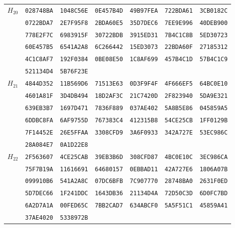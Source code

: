 \begin{table}
\begin{tabular}{@{}ccccccc@{}}
\midrule
\multirow{6}{*}{$H_{20}$}
 & \texttt{028748BA} & \texttt{1048C56E} & \texttt{0E457B4D} & \texttt{49B97FEA} & \texttt{722BDA61} & \texttt{3CB0182C}\\
 & \texttt{0722BDA7} & \texttt{2E7F95F8} & \texttt{2BDA60E5} & \texttt{35D7DEC6} & \texttt{7EE9E996} & \texttt{40DEB900}\\
 & \texttt{778E2F7C} & \texttt{6983915F} & \texttt{30722BDB} & \texttt{3915ED31} & \texttt{7B4C1C8B} & \texttt{5ED30723}\\
 & \texttt{60E457B5} & \texttt{6541A2A8} & \texttt{6C266442} & \texttt{15ED3073} & \texttt{22BDA60F} & \texttt{27185312}\\
 & \texttt{4C1C8AF7} & \texttt{192F0384} & \texttt{0BE08E50} & \texttt{1C8AF699} & \texttt{457B4C1D} & \texttt{57B4C1C9}\\
 & \texttt{521134D4} & \texttt{5B76F23E}\\

\midrule
\multirow{6}{*}{$H_{21}$}
 & \texttt{4844D352} & \texttt{11B569D6} & \texttt{71513E63} & \texttt{0D3F9F4F} & \texttt{4F666EF5} & \texttt{64BC0E10}\\
 & \texttt{4601A81F} & \texttt{3D4DB494} & \texttt{18D2AF3C} & \texttt{21C7420D} & \texttt{2F823940} & \texttt{5DA9E321}\\
 & \texttt{639EB3B7} & \texttt{1697D471} & \texttt{7836F889} & \texttt{037AE402} & \texttt{5A8B5E86} & \texttt{045859A5}\\
 & \texttt{6DDBC8FA} & \texttt{6AF9755D} & \texttt{767383C4} & \texttt{412315B8} & \texttt{54CE25CB} & \texttt{1FF0129B}\\
 & \texttt{7F14452E} & \texttt{26E5FFAA} & \texttt{3308CFD9} & \texttt{3A6F0933} & \texttt{342A727E} & \texttt{53EC986C}\\
 & \texttt{28A084E7} & \texttt{0A1D22E8}\\

\midrule
\multirow{6}{*}{$H_{22}$}
 & \texttt{2F563607} & \texttt{4CE25CAB} & \texttt{39EB3B6D} & \texttt{308CFD87} & \texttt{4BC0E10C} & \texttt{3EC986CA}\\
 & \texttt{75F7B19A} & \texttt{11616691} & \texttt{64680157} & \texttt{0EBBAD11} & \texttt{42A727E6} & \texttt{1806A07B}\\
 & \texttt{099910B6} & \texttt{541A2A8C} & \texttt{07DC6BFB} & \texttt{7C907770} & \texttt{28748BA0} & \texttt{2631F0ED}\\
 & \texttt{5D7DEC66} & \texttt{1F241DDC} & \texttt{1643DB36} & \texttt{21134D4A} & \texttt{72D50C3D} & \texttt{6D0FC7BD}\\
 & \texttt{6A2D7A1A} & \texttt{00FED65C} & \texttt{7BB2CAD7} & \texttt{634ABCF0} & \texttt{5A5F51C1} & \texttt{45859A41}\\
 & \texttt{37AE4020} & \texttt{5338972B}\\


\end{tabular}
\end{table}
